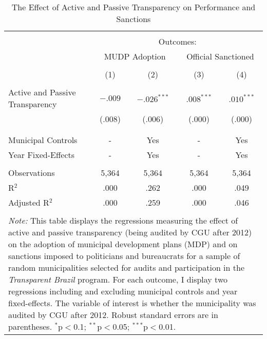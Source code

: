 
\begin{table}[!htbp] \centering
  \caption{The Effect of Active and Passive Transparency on Performance and Sanctions}
  \label{tab:performance3}
\scriptsize
\begin{tabular}{@{\extracolsep{5pt}}lcccc}
\\[-1.8ex]\hline
\hline \\[-1.8ex]
& \multicolumn{4}{c}{Outcomes:} \T \B \\
\cline{2-5}
 & \multicolumn{2}{c}{MUDP Adoption} & \multicolumn{2}{c}{Official Sanctioned} \T \B \\
\\[-1.8ex] & \multicolumn{1}{c}{(1)} & \multicolumn{1}{c}{(2)} & \multicolumn{1}{c}{(3)} & \multicolumn{1}{c}{(4)}\\
\hline \\[-1.8ex]
 Active and Passive Transparency & $-.009$ & $-.026^{***}$ & \hspace{1pt} $.008^{***}$ & \hspace{1pt} $.010^{***}$ \\
                                 & (.008) & (.006) & (.000) & (.000) \\
                                 & & & & \\
\hline \\[-1.8ex]
Municipal Controls & \multicolumn{1}{c}{-} & \multicolumn{1}{c}{Yes} & \multicolumn{1}{c}{-} & \multicolumn{1}{c}{Yes} \\
Year Fixed-Effects & \multicolumn{1}{c}{-} & \multicolumn{1}{c}{Yes} & \multicolumn{1}{c}{-} & \multicolumn{1}{c}{Yes} \\
\hline \\[-1.8ex]
Observations & \multicolumn{1}{c}{5,364} & \multicolumn{1}{c}{5,364} & \multicolumn{1}{c}{5,364} & \multicolumn{1}{c}{5,364} \\
R$^{2}$ & \multicolumn{1}{c}{.000} & \multicolumn{1}{c}{.262} & \multicolumn{1}{c}{.000} & \multicolumn{1}{c}{.049} \\
Adjusted R$^{2}$ & \multicolumn{1}{c}{.000} & \multicolumn{1}{c}{.259} & \multicolumn{1}{c}{.000} & \multicolumn{1}{c}{.046} \\
\hline
\hline \\[-1.8ex]
\multicolumn{5}{p{.65\textwidth}}{\emph{Note:} This table displays the regressions measuring the effect of active and passive transparency (being audited by CGU after 2012) on the adoption of municipal development plans (MDP) and on sanctions imposed to politicians and bureaucrats for a sample of random municipalities selected for audits and participation in the \emph{Transparent Brazil} program. For each outcome, I display two regressions including and excluding municipal controls and year fixed-effects. The variable of interest is whether the municipality was audited by CGU after 2012. Robust standard errors are in parentheses. $^{*}$p$<$0.1; $^{**}$p$<$0.05; $^{***}$p$<$0.01.}
\end{tabular}
\end{table}
